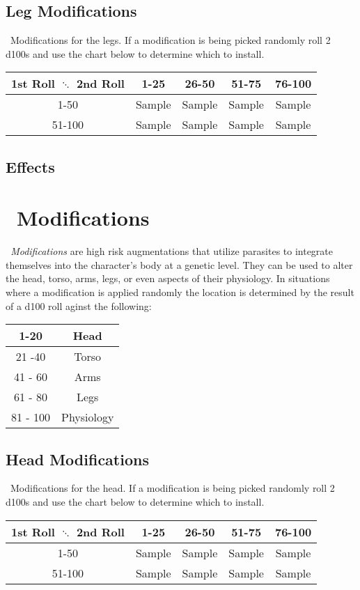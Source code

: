 \subsection{Leg Modifications}
\cybert\ Modifications for the legs. If a modification is being picked randomly roll 2 d100s and use the chart below to determine which to install.
\begin{center}
\begin{tabular}{c | c | c | c | c}
1st Roll $\ddots$ 2nd Roll & 1-25 & 26-50 & 51-75 & 76-100 \\
\hline
1-50 & Sample & Sample & Sample & Sample\\
\hline
51-100 & Sample & Sample & Sample & Sample\\
\end{tabular}
\end{center}
\subsection*{Effects}
\begin{multicols}{2}
\end{multicols}
\clearpage

\section{\biot\ Modifications}\label{sec:bio_mods}
\emph{\biot\ Modifications} are high risk augmentations that utilize parasites to integrate themselves into the character's body at a genetic level. They can be used to alter the head, torso, arms, legs, or even aspects of their physiology. In situations where a modification is applied randomly the location is determined by the result of a d100 roll aginst the following:
\begin{center}
\begin{tabular}{c | c}
1-20 & Head \\
\hline
21 -40 & Torso \\
\hline
41 - 60 & Arms \\
\hline
61 - 80 & Legs \\
\hline
81 - 100 & Physiology \\
\end{tabular}
\end{center}

\subsection{Head Modifications}
\biot\ Modifications for the head. If a modification is being picked randomly roll 2 d100s and use the chart below to determine which to install.
\begin{center}
\begin{tabular}{c | c | c | c | c}
1st Roll $\ddots$ 2nd Roll & 1-25 & 26-50 & 51-75 & 76-100 \\
\hline
1-50 & Sample & Sample & Sample & Sample\\
\hline
51-100 & Sample & Sample & Sample & Sample\\
\end{tabular}
\end{center}

